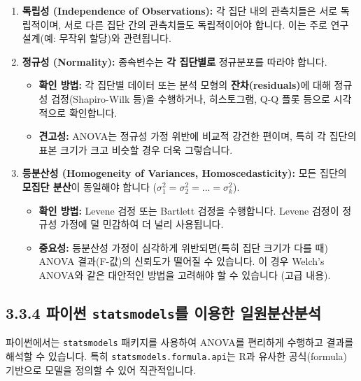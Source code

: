 \documentclass[
  letterpaper,
]{book}
\providecommand{\tightlist}{%
  \setlength{\itemsep}{0pt}\setlength{\parskip}{0pt}}
\begin{document}
\begin{enumerate}
\def\labelenumi{\arabic{enumi}.}
\tightlist
\item
  \textbf{독립성 (Independence of Observations):} 각 집단 내의
  관측치들은 서로 독립적이며, 서로 다른 집단 간의 관측치들도
  독립적이어야 합니다. 이는 주로 연구 설계(예: 무작위 할당)와
  관련됩니다.
\item
  \textbf{정규성 (Normality):} 종속변수는 \textbf{각 집단별로}
  정규분포를 따라야 합니다.

  \begin{itemize}
  \tightlist
  \item
    \textbf{확인 방법:} 각 집단별 데이터 또는 분석 모형의
    \textbf{잔차(residuals)}에 대해 정규성 검정(Shapiro-Wilk 등)을
    수행하거나, 히스토그램, Q-Q 플롯 등으로 시각적으로 확인합니다.
  \item
    \textbf{견고성:} ANOVA는 정규성 가정 위반에 비교적 강건한 편이며,
    특히 각 집단의 표본 크기가 크고 비슷할 경우 더욱 그렇습니다.
  \end{itemize}
\item
  \textbf{등분산성 (Homogeneity of Variances, Homoscedasticity):} 모든
  집단의 \textbf{모집단 분산}이 동일해야 합니다
  (\(\sigma_1^2 = \sigma_2^2 = ... = \sigma_k^2\)).

  \begin{itemize}
  \tightlist
  \item
    \textbf{확인 방법:} Levene 검정 또는 Bartlett 검정을 수행합니다.
    Levene 검정이 정규성 가정에 덜 민감하여 더 널리 사용됩니다.
  \item
    \textbf{중요성:} 등분산성 가정이 심각하게 위반되면(특히 집단 크기가
    다를 때) ANOVA 결과(F-값)의 신뢰도가 떨어질 수 있습니다. 이 경우
    Welch's ANOVA와 같은 대안적인 방법을 고려해야 할 수 있습니다 (고급
    내용).
  \end{itemize}
\end{enumerate}

\subsection{\texorpdfstring{3.3.4 파이썬 \texttt{statsmodels}를 이용한
일원분산분석}{3.3.4 파이썬 statsmodels를 이용한 일원분산분석}}\label{uxd30cuxc774uxc36c-statsmodelsuxb97c-uxc774uxc6a9uxd55c-uxc77cuxc6d0uxbd84uxc0b0uxbd84uxc11d}

파이썬에서는 \texttt{statsmodels} 패키지를 사용하여 ANOVA를 편리하게
수행하고 결과를 해석할 수 있습니다. 특히
\texttt{statsmodels.formula.api}는 R과 유사한 공식(formula) 기반으로
모델을 정의할 수 있어 직관적입니다.
\end{document}
